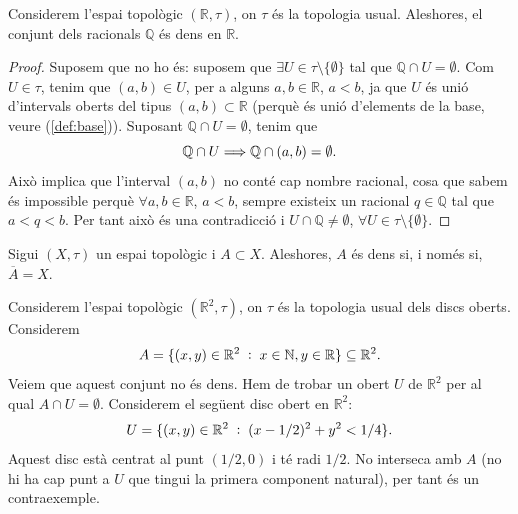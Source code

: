\documentclass[../main.tex]{subfiles}
\begin{document}
\begin{ter}[Exemple]
\label{ej:qesdensar} Considerem l'espai topològic $(\mathbb{R},\tau)$, on $\tau$ és la topologia usual. Aleshores, el conjunt dels racionals $\mathbb{Q}$ és dens en $\mathbb{R}$.
\end{ter}
\begin{proof}
Suposem que no ho és: suposem que $\exists U\in\tau\setminus\{\emptyset\}$ tal que $\mathbb{Q}\cap U = \emptyset$. Com $U\in\tau$, tenim que $(a,b)\in U$, per a alguns $a,b\in\mathbb{R}$, $a<b$, ja que $U$ és unió d'intervals oberts del tipus $(a,b)\subset\mathbb{R}$ (perquè és unió d'elements de la base, veure (\ref{def:base})). Suposant $\mathbb{Q}\cap U = \emptyset$, tenim que
\begin{equation}
    \notag
    \mathbb{Q}\cap U \Longrightarrow \mathbb{Q}\cap (a,b) = \emptyset.
\end{equation}
Això implica que l'interval $(a,b)$ no conté cap nombre racional, cosa que sabem és impossible perquè $\forall a,b\in\mathbb{R}$, $a<b$, sempre existeix un racional $q\in\mathbb{Q}$ tal que $a<q<b$. Per tant això és una contradicció i $U\cap\mathbb{Q}\not=\emptyset$, $\forall U\in\tau\setminus\{\emptyset\}$.
\end{proof}

\begin{prop}
\label{prop:dens} Sigui $(X,\tau)$ un espai topològic i $A\subset X$. Aleshores, $A$ és dens si, i només si, $\overline{A}=X$.
\end{prop}

\begin{ej}
\label{ej:dens2} Considerem l'espai topològic $(\mathbb{R}^2,\tau)$, on $\tau$ és la topologia usual dels discs oberts. Considerem
\begin{equation}
    \notag
    A = \{(x,y)\in\mathbb{R}^2\;:\;x\in\mathbb{N},y\in\mathbb{R}\}\subseteq\mathbb{R}^2.
\end{equation}
Veiem que aquest conjunt no és dens. Hem de trobar un obert $U$ de $\mathbb{R}^2$ per al qual $A\cap U = \emptyset$. Considerem el següent disc obert en $\mathbb{R}^2$:
\begin{equation}
    \notag
    U = \{(x,y)\in\mathbb{R}^2\;:\;(x-1/2)^2+y^2<1/4\} .
\end{equation}
Aquest disc està centrat al punt $(1/2,0)$ i té radi $1/2$. No interseca amb $A$ (no hi ha cap punt a $U$ que tingui la primera component natural), per tant és un contraexemple.
\end{ej}
\end{document}
